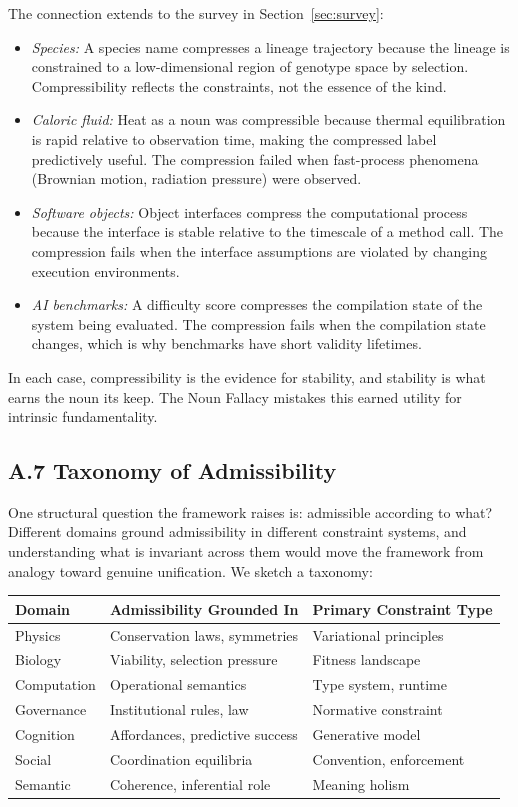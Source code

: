 \documentclass[12pt, a4paper]{article}
\theoremstyle{plain}
\theoremstyle{definition}
\theoremstyle{remark}
\begin{document}
The connection extends to the survey in Section~\ref{sec:survey}:
\begin{itemize}[leftmargin=*]
\item \emph{Species:} A species name compresses a lineage trajectory
because the lineage is constrained to a low-dimensional region of genotype
space by selection. Compressibility reflects the constraints, not the
essence of the kind.
\item \emph{Caloric fluid:} Heat as a noun was compressible because thermal
equilibration is rapid relative to observation time, making the compressed
label predictively useful. The compression failed when fast-process phenomena
(Brownian motion, radiation pressure) were observed.
\item \emph{Software objects:} Object interfaces compress the computational
process because the interface is stable relative to the timescale of a
method call. The compression fails when the interface assumptions are violated
by changing execution environments.
\item \emph{AI benchmarks:} A difficulty score compresses the compilation
state of the system being evaluated. The compression fails when the
compilation state changes, which is why benchmarks have short validity lifetimes.
\end{itemize}

In each case, compressibility is the evidence for stability, and stability
is what earns the noun its keep. The Noun Fallacy mistakes this earned
utility for intrinsic fundamentality.

\subsection*{A.7 Taxonomy of Admissibility}

One structural question the framework raises is: admissible according to what?
Different domains ground admissibility in different constraint systems, and
understanding what is invariant across them would move the framework from
analogy toward genuine unification. We sketch a taxonomy:

\begin{center}
\begin{tabular}{lll}
\toprule
\textbf{Domain} & \textbf{Admissibility Grounded In} & \textbf{Primary Constraint Type} \\
\midrule
Physics & Conservation laws, symmetries & Variational principles \\
Biology & Viability, selection pressure & Fitness landscape \\
Computation & Operational semantics & Type system, runtime \\
Governance & Institutional rules, law & Normative constraint \\
Cognition & Affordances, predictive success & Generative model \\
Social & Coordination equilibria & Convention, enforcement \\
Semantic & Coherence, inferential role & Meaning holism \\
\bottomrule
\end{tabular}
\end{center}
\end{document}
